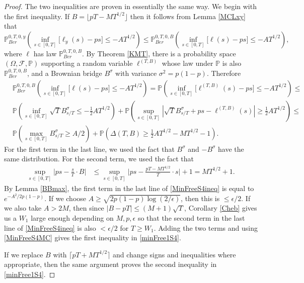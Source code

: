\begin{proof}
	The two inequalities are proven in essentially the same way. We begin with the first inequality. If $B=\lfloor pT - MT^{1/2}\rfloor$ then it follows from Lemma \ref{MCLxy} that
	\begin{equation}\label{MinFreeS4MC}
	\mathbb{P}^{0,T,0,y}_{Ber}\left( \inf_{s \in [ 0, T]}\big[ \ell_y(s) -  ps \big] \leq -AT^{1/2} \right) \leq \mathbb{P}^{0,T,0,B}_{Ber}\left( \inf_{s \in [ 0, T]}\big[ \ell(s) -  ps \big] \leq -AT^{1/2} \right),
	\end{equation}
	where $\ell$ has law $\mathbb{P}^{0,T,0,B}_{Ber}$. By Theorem \ref{KMT}, there is a probability space $(\Omega,\mathcal{F},\mathbb{P})$ supporting a random variable $\ell^{(T,B)}$ whose law under $\mathbb{P}$ is also $\mathbb{P}^{0,T,0,B}_{Ber}$, and a Brownian bridge $B^\sigma$ with variance $\sigma^2 = p(1-p)$. Therefore
	\begin{equation}\label{MinFreeS4ineq}
	\begin{split}
	&\mathbb{P}^{0,T,0,B}_{Ber}\left( \inf_{s \in [ 0, T]}\big[ \ell(s) -  ps \big] \leq -AT^{1/2} \right) = \mathbb{P}\left( \inf_{s \in [ 0, T]}\big[ \ell^{(T,B)}(s) -  ps \big] \leq -AT^{1/2} \right) \leq\\
	& \mathbb{P}\left( \inf_{s \in [ 0, T]}  \sqrt{T}B^\sigma_{s/T} \leq -\frac{1}{2}AT^{1/2} \right) + \mathbb{P}\left( \sup_{s\in [0,T]} \left|\sqrt{T} B^\sigma_{s/T} + ps - \ell^{(T,B)}(s) \right| \geq \frac{1}{2}AT^{1/2} \right) \leq\\
	& \mathbb{P}\left( \max_{s\in[0,T]} B^\sigma_{s/T} \geq A/2 \right) + \mathbb{P}\left(\Delta(T,B) \geq \frac{1}{2}AT^{1/2} - MT^{1/2} - 1\right). 
	\end{split}
	\end{equation}
	For the first term in the last line, we used the fact that $B^\sigma$ and $-B^\sigma$ have the same distribution. For the second term, we used the fact that
	\begin{align*}
	\sup_{s\in[0,T]}\Big| ps - \frac{s}{T}\cdot B \Big| &\leq \sup_{s\in[0,T]}\Big| ps - \frac{pT-MT^{1/2}}{T}\cdot s \Big| + 1 = MT^{1/2} + 1.
	\end{align*}
	By Lemma \ref{BBmax}, the first term in the last line of \eqref{MinFreeS4ineq} is equal to $e^{-A^2/2p(1-p)}$. If we choose $A \geq \sqrt{2p(1-p)\log(2/\epsilon)}$, then this is $\leq \epsilon/2$. If we also take $A > 2M$, then since $|B-pT| \leq (M+1)\sqrt{T}$, Corollary \ref{Cheb} gives us a $W_1$ large enough depending on $M,p,\epsilon$ so that the second term in the last line of \eqref{MinFreeS4ineq} is also $<\epsilon/2$ for $T\geq W_1$. Adding the two terms and using \eqref{MinFreeS4MC} gives the first inequality in \eqref{minFree1S4}.
	
	If we replace $B$ with $\lceil pT + MT^{1/2} \rceil$ and change signs and inequalities where appropriate, then the same argument proves the second inequality in \eqref{minFree1S4}.
\end{proof}

